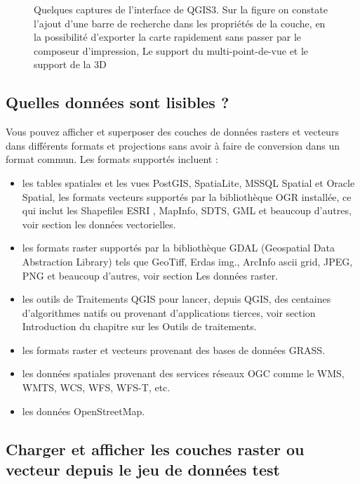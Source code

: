 \documentclass[a4paper, 11pt]{article}
\begin{document}
\begin{figure}
    \caption{Quelques captures de l'interface de QGIS3. Sur la figure  on constate l'ajout d'une barre de recherche dans les propriétés de la couche, en
      la possibilité d'exporter la carte rapidement sans passer par le composeur d'impression,  Le support du multi-point-de-vue et
      le support de la 3D}
    \label{fig:qgis3-interfaces}
  \end{figure}

  \subsection{Quelles données sont lisibles ?}
  Vous pouvez afficher et superposer des couches de données rasters et vecteurs dans différents formats et projections sans avoir à faire de conversion dans un format commun. Les formats supportés incluent :
  \begin{itemize}
    \item les tables spatiales et les vues PostGIS, SpatiaLite, MSSQL Spatial et Oracle Spatial, les formats vecteurs supportés par la bibliothèque OGR installée, ce qui inclut les Shapefiles ESRI , MapInfo, SDTS, GML et beaucoup d’autres, voir section les données vectorielles.
    \item les formats raster supportés par la bibliothèque GDAL (Geospatial Data Abstraction Library) tels que GeoTiff, Erdas img., ArcInfo ascii grid, JPEG, PNG et beaucoup d’autres, voir section Les données raster.
    \item les outils de Traitements QGIS pour lancer, depuis QGIS, des centaines d’algorithmes natifs ou provenant d’applications tierces, voir section Introduction du chapitre sur les Outils de traitements.
    \item les formats raster et vecteurs provenant des bases de données GRASS.
    \item les données spatiales provenant des services réseaux OGC comme le WMS, WMTS, WCS, WFS, WFS-T, etc.
    \item les données OpenStreetMap.
  \end{itemize}
  \subsection{Charger et afficher les couches raster ou vecteur depuis le jeu de données test}
\end{document}
